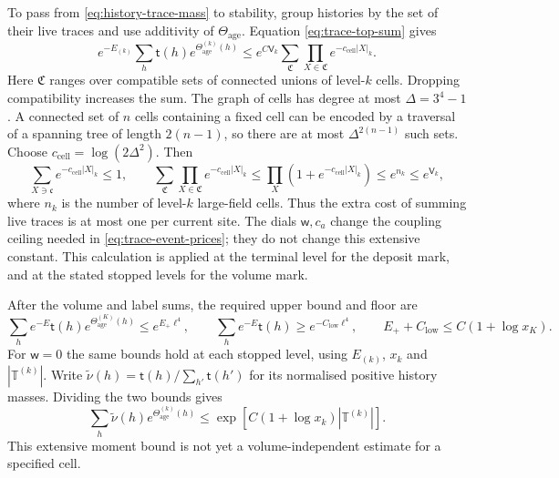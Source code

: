 \documentclass[11pt,letterpaper,reqno]{amsart}
\theoremstyle{definition}
\theoremstyle{remark}
\begin{document}
To pass from \eqref{eq:history-trace-mass} to stability, group
histories by the set of their live traces and use additivity
of \(\Theta_{\mathrm{age}}\). Equation
\eqref{eq:trace-top-sum} gives
\[
 e^{-E_{(k)}}\sum_h\mathsf t(h)
                         e^{\Theta_{\mathrm{age}}^{(k)}(h)}
 \le e^{C \mathsf V_k}
       \sum_{\mathfrak C}\prod_{X\in\mathfrak C}
                                      e^{-c_{\mathrm{cell}}|X|_k}.
\]
Here \(\mathfrak C\) ranges over compatible sets of connected
unions of level-\(k\) cells. Dropping compatibility increases
the sum. The graph of cells has degree at most
\(\Delta=3^4-1\). A connected set of \(n\) cells containing
a fixed cell can be encoded by a traversal of a spanning
tree of length \(2(n-1)\), so there are at most
\(\Delta^{2(n-1)}\) such sets. Choose
\(c_{\mathrm{cell}}=\log(2\Delta^2)\). Then
\[
 \sum_{X\ni\mathfrak c}e^{-c_{\mathrm{cell}}|X|_k}\le1,
 \qquad
 \sum_{\mathfrak C}\prod_{X\in\mathfrak C}
                                      e^{-c_{\mathrm{cell}}|X|_k}
 \le\prod_X(1+e^{-c_{\mathrm{cell}}|X|_k})
 \le e^{n_k}\le e^{\mathsf V_k},
\]
where \(n_k\) is the number of level-\(k\) large-field cells.
Thus the extra cost of summing live traces is at most one
per current site. The dials \(\mathsf w,c_a\) change the
coupling ceiling needed in \eqref{eq:trace-event-prices};
they do not change this extensive constant. This calculation
is applied at the terminal level for the deposit mark, and
at the stated stopped levels for the volume mark.

After the volume and label sums, the required
upper bound and floor are
\begin{equation}\label{eq:mrg-marked-stability}
 \sum_he^{-E}\mathsf t(h)e^{\Theta_{\mathrm{age}}^{(K)}(h)}
       \le e^{E_+\ell^4},\qquad
 \sum_he^{-E}\mathsf t(h)\ge e^{-C_{\mathrm{low}}\ell^4},
 \qquad E_++C_{\mathrm{low}}\le C(1+\log x_K).
\end{equation}
For $\mathsf w=0$ the same bounds hold at each
stopped level, using $E_{(k)}$, $x_k$ and
$|\mathbb T^{(k)}|$. Write
$\widetilde\nu(h)=\mathsf t(h)/\sum_{h'}\mathsf t(h')$
for its normalised positive history masses. Dividing
the two bounds gives
\begin{equation}\label{eq:mrg-mark-moment}
 \sum_h\widetilde\nu(h)
                e^{\Theta_{\mathrm{age}}^{(k)}(h)}
       \le \exp[C(1+\log x_k)|\mathbb T^{(k)}|].
\end{equation}
This extensive moment bound is not yet a
volume-independent estimate for a specified cell.
\end{document}

